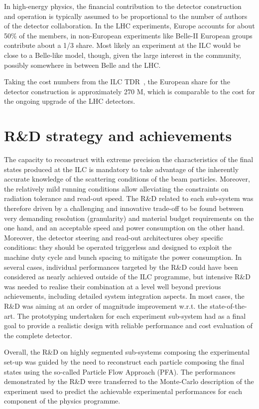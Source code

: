 \documentclass[%
 reprint,
 amsmath,amssymb,
 aps,
]{revtex4-1}
\begin{document}
In high-energy physics, the financial contribution to the detector
construction and operation
is typically assumed to be proportional to the number of authors of
the detector collaboration. In the LHC experiments, Europe accounts for about 50\% of the members, in non-European experiments like Belle-II European groups contribute about a 1/3 share. Most likely an experiment at the ILC would be close to a Belle-like model, though, given the large interest in the community, possibly somewhere in between Belle and the LHC. 

Taking
the cost numbers from
the ILC TDR~\cite{ILC-TDR}, the European share for the detector
construction is approximately 270 M\Euro{}, which is comparable to the cost for the ongoing upgrade of the LHC detectors.

\section{\label{sec:RandD}R\&D strategy and achievements}

The capacity to reconstruct with extreme precision the characteristics of the ﬁnal states produced at the ILC is mandatory to take advantage of the inherently accurate knowledge of the scattering conditions of the beam particles. Moreover, the relatively mild running conditions allow alleviating the constraints on radiation tolerance and read-out speed. The R\&D related to each sub-system was therefore driven by a challenging and innovative trade-oﬀ to be found between very demanding resolution (granularity) and material budget requirements on the one hand, and an acceptable speed and power consumption on the other hand. Moreover, the detector steering and read-out architectures obey speciﬁc conditions: they should be operated triggerless and designed to exploit the machine duty cycle and bunch spacing to mitigate the power consumption.
In several cases, individual performances targeted by the R\&D could have been considered as nearly achieved outside of the ILC programme, but intensive R\&D was needed to realise their combination at a level well beyond previous achievements, including detailed system integration aspects. In most cases, the R\&D was aiming at an order of magnitude improvement w.r.t. the state-of-the-art. The prototyping undertaken for each experiment sub-system had as a ﬁnal goal to provide a realistic design with reliable performance and cost evaluation of the complete detector.

Overall, the R\&D on highly segmented sub-systems composing the experimental set-up was guided by the need to reconstruct each particle composing the ﬁnal states using the so-called Particle Flow Approach (PFA). The performances demonstrated by the R&D were transferred to the Monte-Carlo description of the experiment used to predict the achievable experimental performances for each component of the physics programme.
\end{document}

